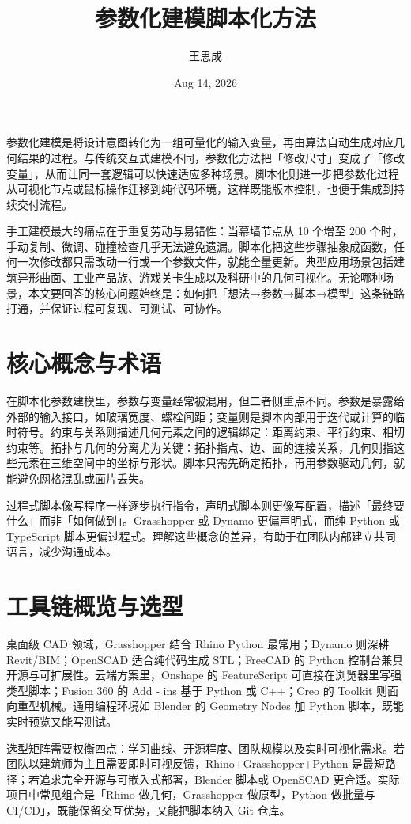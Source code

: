 \title{参数化建模脚本化方法}
\author{王思成}
\date{Aug 14, 2026}
\maketitle
参数化建模是将设计意图转化为一组可量化的输入变量，再由算法自动生成对应几何结果的过程。与传统交互式建模不同，参数化方法把「修改尺寸」变成了「修改变量」，从而让同一套逻辑可以快速适应多种场景。脚本化则进一步把参数化过程从可视化节点或鼠标操作迁移到纯代码环境，这样既能版本控制，也便于集成到持续交付流程。\par
手工建模最大的痛点在于重复劳动与易错性：当幕墙节点从 10 个增至 200 个时，手动复制、微调、碰撞检查几乎无法避免遗漏。脚本化把这些步骤抽象成函数，任何一次修改都只需改动一行或一个参数文件，就能全量更新。典型应用场景包括建筑异形曲面、工业产品族、游戏关卡生成以及科研中的几何可视化。无论哪种场景，本文要回答的核心问题始终是：如何把「想法→参数→脚本→模型」这条链路打通，并保证过程可复现、可测试、可协作。\par
\chapter{核心概念与术语}
在脚本化参数建模里，参数与变量经常被混用，但二者侧重点不同。参数是暴露给外部的输入接口，如玻璃宽度、螺栓间距；变量则是脚本内部用于迭代或计算的临时符号。约束与关系则描述几何元素之间的逻辑绑定：距离约束、平行约束、相切约束等。拓扑与几何的分离尤为关键：拓扑指点、边、面的连接关系，几何则指这些元素在三维空间中的坐标与形状。脚本只需先确定拓扑，再用参数驱动几何，就能避免网格混乱或面片丢失。\par
过程式脚本像写程序一样逐步执行指令，声明式脚本则更像写配置，描述「最终要什么」而非「如何做到」。Grasshopper 或 Dynamo 更偏声明式，而纯 Python 或 TypeScript 脚本更偏过程式。理解这些概念的差异，有助于在团队内部建立共同语言，减少沟通成本。\par
\chapter{工具链概览与选型}
桌面级 CAD 领域，Grasshopper 结合 Rhino Python 最常用；Dynamo 则深耕 Revit/BIM；OpenSCAD 适合纯代码生成 STL；FreeCAD 的 Python 控制台兼具开源与可扩展性。云端方案里，Onshape 的 FeatureScript 可直接在浏览器里写强类型脚本；Fusion 360 的 Add ‑ ins 基于 Python 或 C++；Creo 的 Toolkit 则面向重型机械。通用编程环境如 Blender 的 Geometry Nodes 加 Python 脚本，既能实时预览又能写测试。\par
选型矩阵需要权衡四点：学习曲线、开源程度、团队规模以及实时可视化需求。若团队以建筑师为主且需要即时可视反馈，Rhino+Grasshopper+Python 是最短路径；若追求完全开源与可嵌入式部署，Blender 脚本或 OpenSCAD 更合适。实际项目中常见组合是「Rhino 做几何，Grasshopper 做原型，Python 做批量与 CI/CD」，既能保留交互优势，又能把脚本纳入 Git 仓库。\par
